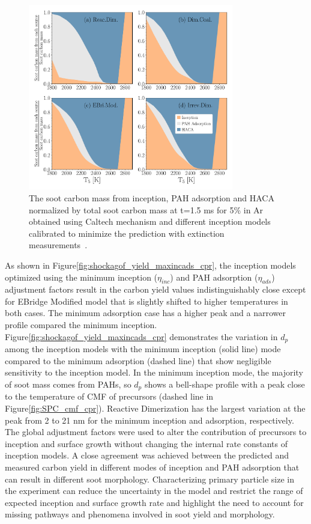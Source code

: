 \begin{figure}[H]
	\centering
	\includegraphics[width=0.8\textwidth]{Figures/Results/Shocktube/Agafonov2016_cpr/C_tot_distmap_5CH4.pdf}
	\caption{The soot carbon mass from inception, PAH adsorption and HACA normalized by total soot carbon mass at t=1.5 ms for 5\% in Ar obtained using Caltech mechanism and different inception models calibrated to minimize the prediction with extinction measurements~\citep{agafonov2016unified}.}
	\label{fig:shockagof_carbon_map_cpr} 
\end{figure}

As shown in Figure\ref{fig:shockagof_yield_maxincads_cpr}, the inception models optimized using the minimum inception ($\eta_{inc}$) and PAH adsorption ($\eta_{ads}$) adjustment factors result in the carbon yield values indistinguishably close except for EBridge Modified model that is slightly shifted to higher temperatures in both cases. The minimum adsorption case has a higher peak and a narrower profile compared the minimum inception. Figure\ref{fig:shockagof_yield_maxincads_cpr} demonstrates the variation in $d_p$ among the inception models with the minimum inception (solid line) mode compared to the minimum adsorption (dashed line) that show negligible sensitivity to the inception model. In the minimum inception mode, the majority of soot mass comes from PAHs, so $d_p$ shows a bell-shape profile with a peak close to the temperature of CMF of precursors (dashed line in Figure\ref{fig:SPC_cmf_cpr}). Reactive Dimerization has the largest variation at the peak from 2 to 21 nm for the minimum inception and adsorption, respectively. The global adjustment factors were used to alter the contribution of precursors to inception and surface growth without changing the internal rate constants of inception models. A close agreement was achieved between the predicted and measured carbon yield in different modes of inception and PAH adsorption that can result in different soot morphology. Characterizing primary particle size in the experiment can reduce the uncertainty in the model and restrict the range of expected inception and surface growth rate and highlight the need to account for missing pathways and phenomena involved in soot yield and morphology.

